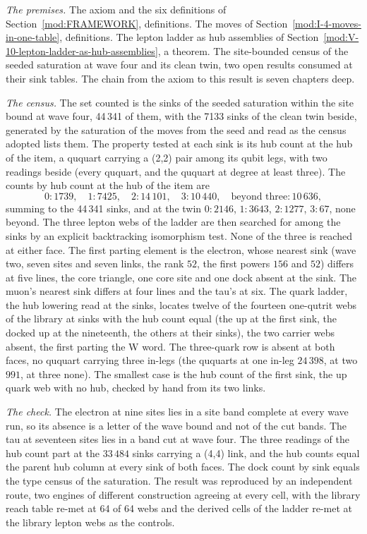\begin{chproof}
\textit{The premises.} The axiom and the six definitions of Section~\ref{mod:FRAMEWORK}, definitions. The moves of Section~\ref{mod:I-4-moves-in-one-table}, definitions. The lepton ladder as hub assemblies of Section~\ref{mod:V-10-lepton-ladder-as-hub-assemblies}, a theorem. The site-bounded census of the seeded saturation at wave four and its clean twin, two open results consumed at their sink tables. The chain from the axiom to this result is seven chapters deep.

\textit{The census.} The set counted is the sinks of the seeded saturation within the site bound at wave four, 44\,341 of them, with the 7133 sinks of the clean twin beside, generated by the saturation of the moves from the seed and read as the census adopted lists them. The property tested at each sink is its hub count at the hub of the item, a ququart carrying a (2,2) pair among its qubit legs, with two readings beside (every ququart, and the ququart at degree at least three). The counts by hub count at the hub of the item are
\begin{equation}
0:1739,\quad 1:7425,\quad 2:14\,101,\quad 3:10\,440,\quad \text{beyond three}:10\,636 ,
\end{equation}
summing to the 44\,341 sinks, and at the twin $0:2146$, $1:3643$, $2:1277$, $3:67$, none beyond. The three lepton webs of the ladder are then searched for among the sinks by an explicit backtracking isomorphism test. None of the three is reached at either face. The first parting element is the electron, whose nearest sink (wave two, seven sites and seven links, the rank $52$, the first powers $156$ and $52$) differs at five lines, the core triangle, one core site and one dock absent at the sink. The muon's nearest sink differs at four lines and the tau's at six. The quark ladder, the hub lowering read at the sinks, locates twelve of the fourteen one-qutrit webs of the library at sinks with the hub count equal (the up at the first sink, the docked up at the nineteenth, the others at their sinks), the two carrier webs absent, the first parting the W word. The three-quark row is absent at both faces, no ququart carrying three in-legs (the ququarts at one in-leg $24\,398$, at two $991$, at three none). The smallest case is the hub count of the first sink, the up quark web with no hub, checked by hand from its two links.

\textit{The check.} The electron at nine sites lies in a site band complete at every wave run, so its absence is a letter of the wave bound and not of the cut bands. The tau at seventeen sites lies in a band cut at wave four. The three readings of the hub count part at the $33\,484$ sinks carrying a (4,4) link, and the hub counts equal the parent hub column at every sink of both faces. The dock count by sink equals the type census of the saturation. The result was reproduced by an independent route, two engines of different construction agreeing at every cell, with the library reach table re-met at 64 of 64 webs and the derived cells of the ladder re-met at the library lepton webs as the controls.
\end{chproof}
